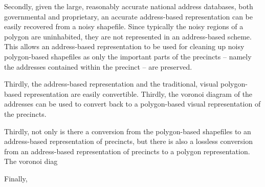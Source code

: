\documentclass[11pt]{article}
\begin{document}
Secondly, given the large, reasonably accurate national address databases, both governmental and proprietary, an accurate address-based representation can be easily recovered from a noisy shapefile.
Since typically the noisy regions of a polygon are uninhabited, they are not represented in an address-based scheme.
This allows an address-based representation to be used for cleaning up noisy polygon-based shapefiles as only the important parts of the precincts -- namely the addresses contained within the precinct -- are preserved.

Thirdly, the address-based representation and the traditional, visual polygon-based representation are easily convertible.
Thirdly, the voronoi diagram of the addresses can be used to convert back to a polygon-based visual representation of the precincts.

Thirdly, not only is there a conversion from the polygon-based shapefiles to an address-based representation of precincts, but there is also a lossless conversion from an address-based representation of precincts to a polygon representation.
The voronoi diag

Finally, 
\end{document}

